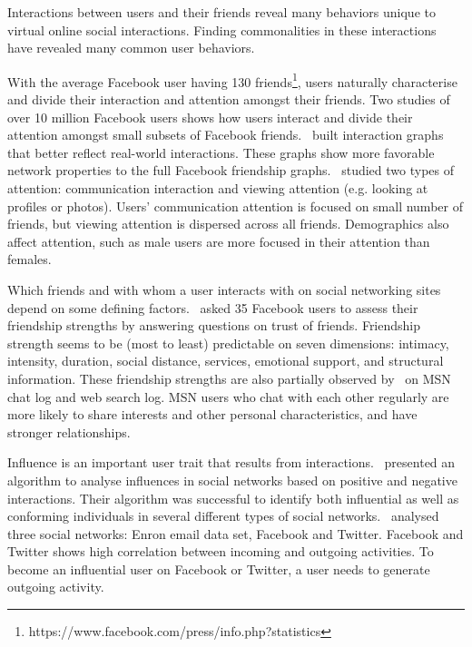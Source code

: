 \documentclass[letterpaper]{article}
\begin{document}
Interactions between users and their friends reveal many behaviors unique to virtual online social interactions. Finding commonalities in these interactions have revealed many common user behaviors.


With the average Facebook user having 130 friends\footnote{https://www.facebook.com/press/info.php?statistics}, users naturally characterise and divide their interaction and attention amongst their friends. Two studies of over 10 million Facebook users shows how users interact and divide their attention amongst small subsets of Facebook friends.~\cite{wilson2009user} built interaction graphs that better reflect real-world interactions. These graphs show more favorable network properties to the full Facebook friendship graphs.~\cite{backstrom2011center} studied two types of attention: communication interaction and viewing attention (e.g. looking at profiles or photos). Users' communication attention is focused on small number of friends, but viewing attention is dispersed across all friends. Demographics also affect attention, such as male users are more focused in their attention than females.


Which friends and with whom a user interacts with on social networking sites depend on some defining factors.~\cite{gilbert2009predicting} asked 35 Facebook users to assess their friendship strengths by answering questions on trust of friends. Friendship strength seems to be (most to least) predictable on seven dimensions: intimacy, intensity, duration, social distance, services, emotional support, and structural information. These friendship strengths are also partially observed by~\cite{singla2008yes} on MSN chat log and web search log. MSN users who chat with each other regularly are more likely to share interests and other personal characteristics, and have stronger relationships.


Influence is an important user trait that results from interactions.~\cite{li2011casino} presented an algorithm to analyse influences in social networks based on positive and negative interactions. Their algorithm was successful to identify both influential as well as conforming individuals in several different types of social networks.~\cite{saez2011high} analysed three social networks: Enron email data set, Facebook and Twitter. Facebook and Twitter shows high correlation between incoming and outgoing activities. To become an influential user on Facebook or Twitter, a user needs to generate outgoing activity.
\end{document}
